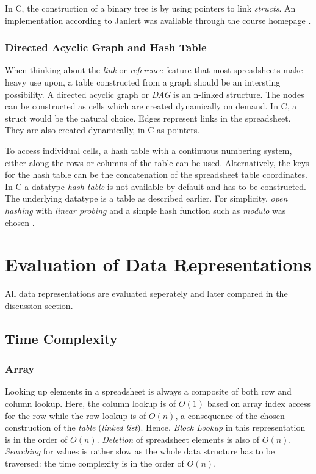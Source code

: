 \documentclass[a4paper,11pt,twoside]{article}
\begin{document}
In C, the construction of a binary tree is by using pointers to link
\textit{structs}. An implementation according to Janlert
\cite{janlert2000} was available through the course homepage \cite{datatypes}.



\subsubsection{Directed Acyclic Graph and Hash Table}
When thinking about the \emph{link} or \emph{reference} feature that most
spreadsheets make heavy use upon, a table constructed from a graph
should be an intersting possibility.  A directed acyclic graph or
\textit{DAG} is an n-linked structure. The nodes can be
constructed as cells which are created dynamically on demand. In C, a
struct would be the natural choice. Edges represent links in the
spreadsheet. They are also created dynamically, in C as pointers. 

To access individual cells, a hash table with a continuous numbering
system, either along the rows or columns of the table can be
used. Alternatively, the keys for the hash table can be the
concatenation of the spreadsheet table coordinates. In C a
datatype \textit{hash table} is not available by default and has to be
constructed. The underlying datatype is a table as described
earlier. For simplicity, \emph{open hashing} with \emph{linear
 probing} and a simple hash function such as \textit{modulo} was
chosen \cite[p. 277]{janlert2000}. 


\section{Evaluation of Data Representations}
All data representations are evaluated seperately and later compared
in the discussion section.
\subsection{Time Complexity}
\subsubsection{Array}
Looking up elements in a spreadsheet is always a composite of both row
and column lookup. Here, the column lookup is of $O(1)$ based on array
index access for the row while the row lookup is of $O(n)$, a
consequence of the chosen construction of the \textit{table}
(\textit{linked list}). Hence, \emph{Block Lookup} in this representation
is in the order of $O(n)$. \emph{Deletion} of spreadsheet elements is
also of $O(n)$. \emph{Searching} for values is rather slow as the whole
data structure has to be traversed: the time complexity is in the
order of $O(n)$.
\end{document}
